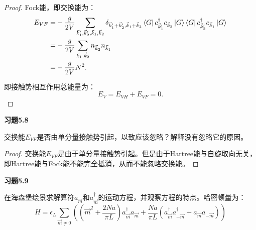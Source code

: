 \documentclass[reqno,a4paper,12pt]{amsart}
\begin{document}
\begin{proof}
Fock能，即交换能为：
\begin{align*}
	E_{VF} =& -\frac{g}{2V} \sum_{\vec{k}_1',\vec{k}_2',\vec{k}_1,\vec{k}_2} \delta_{\vec{k}_1'+\vec{k}_2', \vec{k}_1+\vec{k}_2} \bra{G} c^\dagger_{\vec{k}_1'} c_{\vec{k}_2} \ket{G} \bra{G} c^\dagger_{\vec{k}_2'} c_{\vec{k}_1} \ket{G} \\
	=& -\frac{g}{2V} \sum_{\vec{k}_1, \vec{k}_2} n_{\vec{k}_2} n_{\vec{k}_1} \\
	=& -\frac{g}{2V}N^2.
\end{align*}

即接触势相互作用总能量为：
\[
	E_V = E_{VH} + E_{VF} = 0.
\]
\end{proof}

\medskip

\textbf{习题5.8}

交换能$E_{VF}$是否由单分量接触势引起，以致应该忽略？解释没有忽略它的原因。

\begin{proof}
交换能$E_{VF}$是由于单分量接触势引起。但是由于Hartree能与自旋取向无关，即Hartree能与Fock能不能完全抵消，从而不能忽略交换能。
\end{proof}

\medskip

\textbf{习题5.9}

在海森堡绘景求解算符$a_{\vec{m}}$和$a_{\vec{m}}^\dagger$的运动方程，并观察方程的特点。哈密顿量为：
\[
	H = \epsilon_L \sum_{\vec{m}\neq 0} \left( (\vec{m}^2 + \frac{2Na}{\pi L}) a^\dagger_{\vec{m}} a_{\vec{m}} + \frac{Na}{\pi L} (a^\dagger_{\vec{m}} a^\dagger_{-\vec{m}} + a_{\vec{m}} a_{-\vec{m}}) \right)
\]
\end{document}
